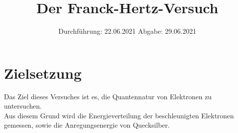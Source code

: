 
\usepackage{parskip}

\subject{V601}
\title{Der Franck-Hertz-Versuch}
\date{
    Durchführung: 22.06.2021
    \hspace{3em}
    Abgabe: 29.06.2021
}



\maketitle
\thispagestyle{empty}
\tableofcontents
\newpage

\section{Zielsetzung}

    Das Ziel dieses Versuches ist es,
    die Quantennatur von Elektronen zu untersuchen.\\
    Aus diesem Grund wird die Energieverteilung der beschleunigten Elektronen gemessen,
    sowie die Anregungsenergie von Quecksilber. 
    

\clearpage


\clearpage

%

%

\printbibliography


